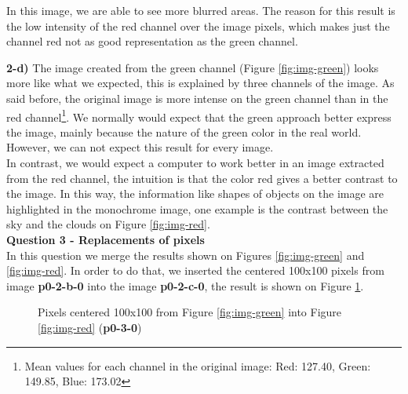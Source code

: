 \documentclass[12pt,a4paper]{article}
\begin{document}
In this image, we are able to see more blurred areas. The reason for this result is the low intensity of the red channel over the image pixels, which makes just the channel red not as good representation as the green channel.

\textbf{2-d) } The image created from the green channel (Figure \ref{fig:img-green}) looks more like what we expected, this is explained by three channels of the image. As said before, the original image is more intense on the green channel than in the red channel\footnote{Mean values for each channel in the original image: Red: 127.40, Green: 149.85, Blue: 173.02}. We normally would expect that the green approach better express the image, mainly because the nature of the green color in the real world. However, we can not expect this result for every image. \\

In contrast, we would expect a computer to work better in an image extracted from the red channel, the intuition is that the color red gives a better contrast to the image. In this way, the information like shapes of objects on the image are highlighted in the monochrome image, one example is the contrast between the sky and the clouds on Figure \ref{fig:img-red}. \\

\textbf{Question 3 - Replacements of pixels} \\

In this question we merge the results shown on Figures \ref{fig:img-green} and \ref{fig:img-red}. In order to do that, we inserted the centered 100x100 pixels from image \textbf{p0-2-b-0} into the image \textbf{p0-2-c-0}, the result is shown on Figure \ref{fig:p0-3-0}. 


\begin{figure}[!h]
	\centering
	{%
		\setlength{\fboxsep}{1pt}%
		\setlength{\fboxrule}{1pt}%
	}%
	\caption{Pixels centered 100x100 from Figure \ref{fig:img-green} into Figure \ref{fig:img-red} (\textbf{p0-3-0})}
	\label{fig:p0-3-0}
\end{figure}
\end{document}
